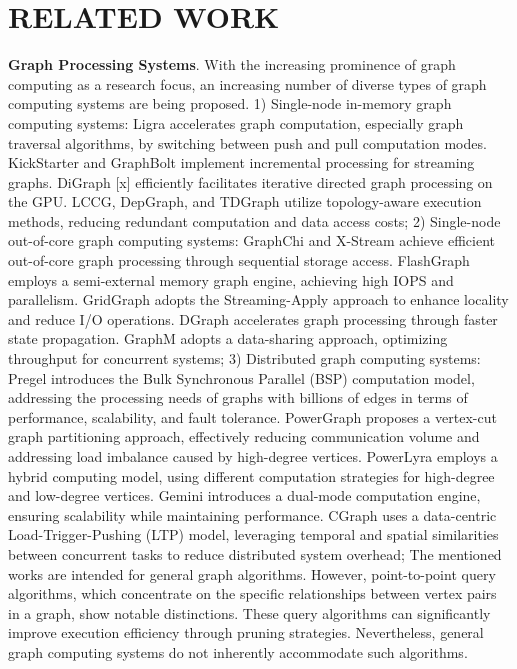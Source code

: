\documentclass[lettersize,journal]{IEEEtran} %
\begin{document}
\section{RELATED WORK}
{\bf{Graph Processing Systems}}. With the increasing prominence of graph computing as a research focus, an increasing number of diverse types of graph computing systems are being proposed. 1) Single-node in-memory graph computing systems: Ligra\cite{ligra} accelerates graph computation, especially graph traversal algorithms, by switching between push and pull computation modes. KickStarter\cite{kickstarter} and GraphBolt\cite{graphbolt} implement incremental processing for streaming graphs. DiGraph [x] efficiently facilitates iterative directed graph processing on the GPU. LCCG\cite{lccg}, DepGraph\cite{depgraph}, and TDGraph\cite{tdgraph} utilize topology-aware execution methods, reducing redundant computation and data access costs; 2) Single-node out-of-core graph computing systems: GraphChi\cite{graphchi} and X-Stream\cite{x-stream} achieve efficient out-of-core graph processing through sequential storage access. FlashGraph\cite{flashgraph} employs a semi-external memory graph engine, achieving high IOPS and parallelism. GridGraph\cite{gridgraph} adopts the Streaming-Apply approach to enhance locality and reduce I/O operations. DGraph\cite{efficient} accelerates graph processing through faster state propagation. GraphM\cite{graphm} adopts a data-sharing approach, optimizing throughput for concurrent systems; 3) Distributed graph computing systems: Pregel\cite{pregel} introduces the Bulk Synchronous Parallel (BSP) computation model, addressing the processing needs of graphs with billions of edges in terms of performance, scalability, and fault tolerance. PowerGraph\cite{powergraph} proposes a vertex-cut graph partitioning approach, effectively reducing communication volume and addressing load imbalance caused by high-degree vertices. PowerLyra\cite{powerlyra} employs a hybrid computing model, using different computation strategies for high-degree and low-degree vertices. Gemini\cite{gemini} introduces a dual-mode computation engine, ensuring scalability while maintaining performance. CGraph\cite{cgraph} uses a data-centric Load-Trigger-Pushing (LTP) model, leveraging temporal and spatial similarities between concurrent tasks to reduce distributed system overhead; The mentioned works are intended for general graph algorithms. However, point-to-point query algorithms, which concentrate on the specific relationships between vertex pairs in a graph, show notable distinctions. These query algorithms can significantly improve execution efficiency through pruning strategies. Nevertheless, general graph computing systems do not inherently accommodate such algorithms.
\end{document}
